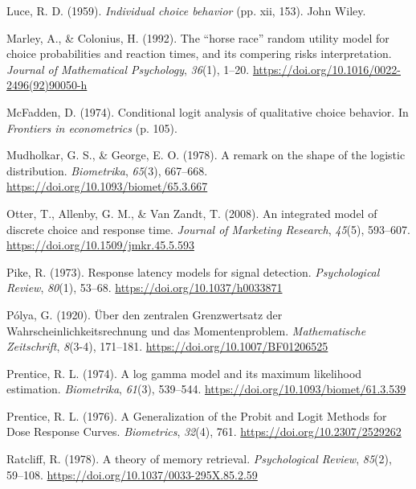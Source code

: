 \documentclass[
  man,
  floatsintext,
  longtable,
  a4paper,
  nolmodern,
  notxfonts,
  notimes,
  colorlinks=true,linkcolor=blue,citecolor=blue,urlcolor=blue]{apa7}
\newlength{\cslhangindent}
\newenvironment{CSLReferences}[2] %
 {\begin{list}{}{%
  \setlength{\itemindent}{0pt}
  \setlength{\leftmargin}{0pt}
  \setlength{\parsep}{0pt}
  \ifodd #1
   \setlength{\leftmargin}{\cslhangindent}
   \setlength{\itemindent}{-1\cslhangindent}
  \fi
  \setlength{\itemsep}{#2\baselineskip}}}
 {\end{list}}
\begin{document}
\begin{CSLReferences}{1}{0}
Luce, R. D. (1959). \emph{Individual choice behavior} (pp. xii, 153).
John Wiley.

Marley, A., \& Colonius, H. (1992). The {``horse race''} random utility
model for choice probabilities and reaction times, and its compering
risks interpretation. \emph{Journal of Mathematical Psychology},
\emph{36}(1), 1--20. \url{https://doi.org/10.1016/0022-2496(92)90050-h}

McFadden, D. (1974). Conditional logit analysis of qualitative choice
behavior. In \emph{Frontiers in econometrics} (p. 105).

Mudholkar, G. S., \& George, E. O. (1978). A remark on the shape of the
logistic distribution. \emph{Biometrika}, \emph{65}(3), 667--668.
\url{https://doi.org/10.1093/biomet/65.3.667}

Otter, T., Allenby, G. M., \& Van Zandt, T. (2008). An integrated model
of discrete choice and response time. \emph{Journal of Marketing
Research}, \emph{45}(5), 593--607.
\url{https://doi.org/10.1509/jmkr.45.5.593}

Pike, R. (1973). Response latency models for signal detection.
\emph{Psychological Review}, \emph{80}(1), 53--68.
\url{https://doi.org/10.1037/h0033871}

Pólya, G. (1920). {Ü}ber den zentralen {Grenzwertsatz} der
{Wahrscheinlichkeitsrechnung} und das {Momentenproblem}.
\emph{Mathematische Zeitschrift}, \emph{8}(3-4), 171--181.
\url{https://doi.org/10.1007/BF01206525}

Prentice, R. L. (1974). A log gamma model and its maximum likelihood
estimation. \emph{Biometrika}, \emph{61}(3), 539--544.
\url{https://doi.org/10.1093/biomet/61.3.539}

Prentice, R. L. (1976). A {Generalization} of the {Probit} and {Logit
Methods} for {Dose Response Curves}. \emph{Biometrics}, \emph{32}(4),
761. \url{https://doi.org/10.2307/2529262}

Ratcliff, R. (1978). A theory of memory retrieval. \emph{Psychological
Review}, \emph{85}(2), 59--108.
\url{https://doi.org/10.1037/0033-295X.85.2.59}


\end{CSLReferences}
\end{document}
